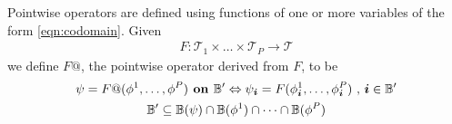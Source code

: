 \documentclass[12pt]{article}
\begin{document}
Pointwise operators are defined using functions of one or more variables of the form \eqref{eqn:codomain}. Given 
\begin{gather*}
F: \mathcal{T}_1 \times \dots \times \mathcal{T}_P \rightarrow \mathcal{T}
\end{gather*}
we define $F@$, the pointwise operator derived from $F$, to be 
\begin{gather*}
\psi = F@(\phi^1 , \dots, \phi^P) \hbox{\bf{ on }} \mathbb{B}' \Leftrightarrow 
\psi_{\boldsymbol{i}} = F(\phi^1_{\boldsymbol{i}}, \dots , \phi^P_{\boldsymbol{i}}) \hbox{ , } {\boldsymbol{i}} \in \mathbb{B}'\\
\mathbb{B}' \subseteq \mathbb{B}(\psi) \cap \mathbb{B}(\phi^1) \cap \dots \cap \mathbb{B}(\phi^P)
\end{gather*}



%
%
%
%
\end{document}
